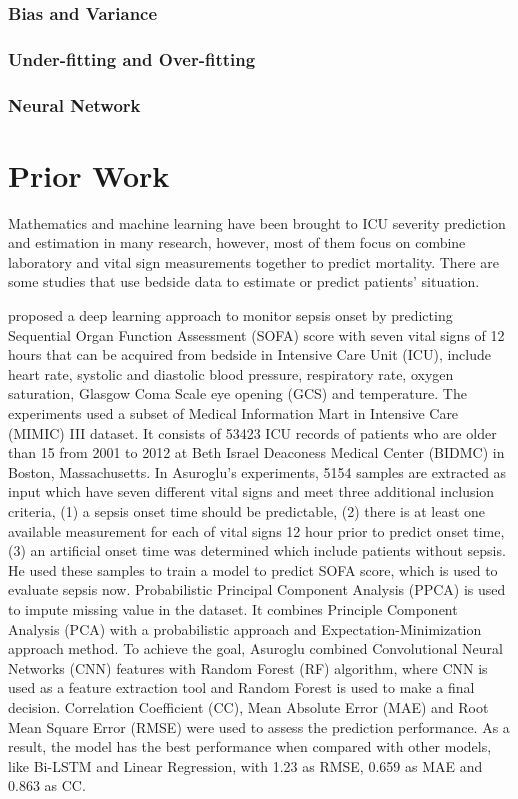 \documentclass[12pt,a4paper,english
]{tunithesis}
\begin{document}
\subsection{Bias and Variance}
\subsection{Under-fitting and Over-fitting}
\subsection{Neural Network}



\chapter{Prior Work}
\label{ch:priorwork}
Mathematics and machine learning have been brought to ICU severity prediction and estimation in many research, however, most of them focus on combine laboratory and vital sign measurements together to predict mortality. There are some studies that use bedside data to estimate or predict patients' situation.

\textcite{asuroglu2021} proposed a deep learning approach to monitor sepsis onset by predicting Sequential Organ Function Assessment (SOFA) score with seven vital signs of 12 hours that can be acquired from bedside in Intensive Care Unit (ICU), include heart rate, systolic and diastolic blood pressure, respiratory rate, oxygen saturation, Glasgow Coma Scale eye opening (GCS) and temperature. The experiments used a subset of Medical Information Mart in Intensive Care (MIMIC) III dataset. It consists of 53423 ICU records of patients who are older than 15 from 2001 to 2012 at Beth Israel Deaconess Medical Center (BIDMC) in Boston, Massachusetts. In Asuroglu's experiments, 5154 samples are extracted as input which have seven different vital signs and meet three additional inclusion criteria, (1) a sepsis onset time should be predictable, (2) there is at least one available measurement for each of vital signs 12 hour prior to predict onset time, (3) an artificial onset time was determined which include patients without sepsis. He used these samples to train a model to predict SOFA score, which is used to evaluate sepsis now. Probabilistic Principal Component Analysis (PPCA) is used to impute missing value in the dataset. It combines Principle Component Analysis (PCA) with a probabilistic approach and Expectation-Minimization approach method. To achieve the goal, Asuroglu combined Convolutional Neural Networks (CNN) features with Random Forest (RF) algorithm, where CNN is used as a feature extraction tool and Random Forest is used to make a final decision. Correlation Coefficient (CC), Mean Absolute Error (MAE) and Root Mean Square Error (RMSE) were used to assess the prediction performance. As a result, the model has the best performance when compared with other models, like Bi-LSTM and Linear Regression, with 1.23 as RMSE, 0.659 as MAE and 0.863 as CC.
\end{document}
